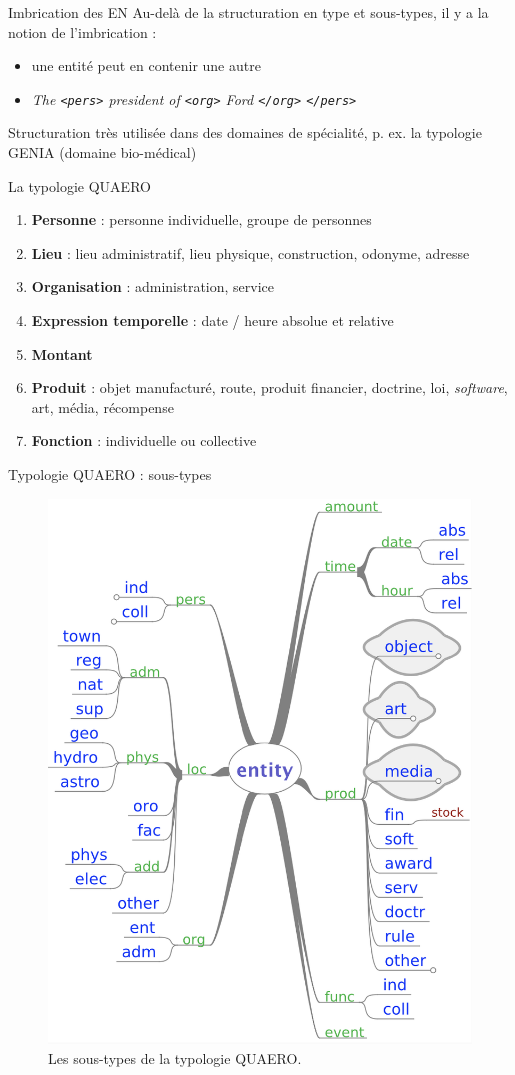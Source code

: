 \documentclass[xetex,xcolor={table,usenames,dvipsnames}]{beamer}
\begin{document}
\begin{frame}{Imbrication des \textsc{EN}}
	Au-delà de la structuration en type et sous-types, il y a la notion de l'imbrication :
	\begin{itemize}
		\item une entité peut en contenir une autre
		\item \textit{The \texttt{<pers>} president of \texttt{<org>} Ford \texttt{</org>} \texttt{</pers>}}
	\end{itemize}
	
	Structuration très utilisée dans des domaines de spécialité, p. ex. la typologie \textsc{GENIA} (domaine bio-médical)
\end{frame}

\begin{frame}{La typologie \textsc{QUAERO}}
	\begin{enumerate}
		\item \textcolor{deepblue}{\textbf{Personne}} : personne individuelle, groupe de personnes
		\item \textcolor{deepblue}{\textbf{Lieu}} : lieu administratif, lieu physique, construction, odonyme, adresse
		\item \textcolor{deepblue}{\textbf{Organisation}} : administration, service
		\item \textcolor{deepblue}{\textbf{Expression temporelle}} : date / heure absolue et relative
		\item \textcolor{deepblue}{\textbf{Montant}}
		\item \textcolor{deepblue}{\textbf{Produit}} : objet manufacturé, route, produit financier, doctrine, loi, \textit{software}, art, média, récompense
		\item \textcolor{deepblue}{\textbf{Fonction}} : individuelle ou collective
	\end{enumerate}
\end{frame}

\begin{frame}{Typologie \textsc{QUAERO} : sous-types}
							\begin{figure}[h] %
		\centering
		\includegraphics[width=.5\linewidth]{img/quaero_sous-types.png}
		\caption{Les sous-types de la typologie \textsc{QUAERO}.}
		\label{fig:ling_out_TAL}
	\end{figure}
\end{frame}
\end{document}
